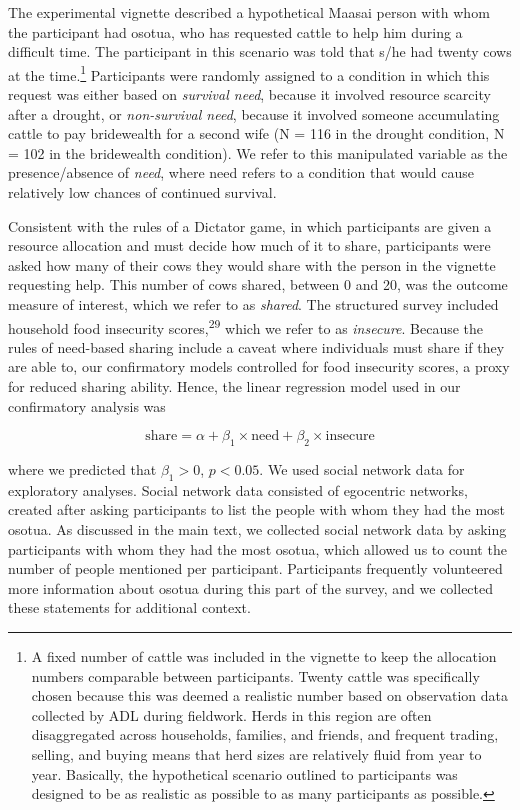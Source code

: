 \documentclass[
]{article}
\begin{document}
The experimental vignette described a hypothetical Maasai person with whom the participant had osotua, who has requested cattle to help him during a difficult time. The participant in this scenario was told that s/he had twenty cows at the time.\footnote{A fixed number of cattle was included in the vignette to keep the allocation numbers comparable between participants. Twenty cattle was specifically chosen because this was deemed a realistic number based on observation data collected by ADL during fieldwork. Herds in this region are often disaggregated across households, families, and friends, and frequent trading, selling, and buying means that herd sizes are relatively fluid from year to year. Basically, the hypothetical scenario outlined to participants was designed to be as realistic as possible to as many participants as possible.} Participants were randomly assigned to a condition in which this request was either based on \emph{survival need}, because it involved resource scarcity after a drought, or \emph{non-survival need}, because it involved someone accumulating cattle to pay bridewealth for a second wife (N = 116 in the drought condition, N = 102 in the bridewealth condition). We refer to this manipulated variable as the presence/absence of \emph{need}, where need refers to a condition that would cause relatively low chances of continued survival.

Consistent with the rules of a Dictator game, in which participants are given a resource allocation and must decide how much of it to share, participants were asked how many of their cows they would share with the person in the vignette requesting help. This number of cows shared, between 0 and 20, was the outcome measure of interest, which we refer to as \emph{shared}. The structured survey included household food insecurity scores,\textsuperscript{29} which we refer to as \emph{insecure}. Because the rules of need-based sharing include a caveat where individuals must share if they are able to, our confirmatory models controlled for food insecurity scores, a proxy for reduced sharing ability. Hence, the linear regression model used in our confirmatory analysis was

\[
\text{share} = \alpha + \beta_1 \times \text{need} + \beta_2 \times \text{insecure}
\]

where we predicted that \(\beta_1 > 0\), \(p < 0.05\). We used social network data for exploratory analyses. Social network data consisted of egocentric networks, created after asking participants to list the people with whom they had the most osotua. As discussed in the main text, we collected social network data by asking participants with whom they had the most osotua, which allowed us to count the number of people mentioned per participant. Participants frequently volunteered more information about osotua during this part of the survey, and we collected these statements for additional context.
\end{document}
